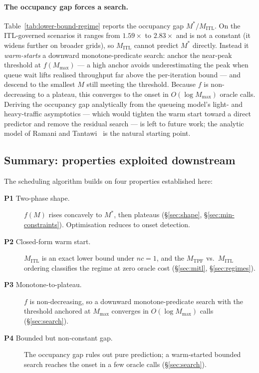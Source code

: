 \paragraph{The occupancy gap forces a search.}
Table~\ref{tab:lower-bound-regime} reports the occupancy gap $M^\ast/M_{\mathrm{ITL}}$.
On the ITL-governed scenarios it ranges from $1.59\times$ to $2.83\times$ and is not a
constant (it widens further on broader grids), so $M_{\mathrm{ITL}}$ cannot predict
$M^\ast$ directly. Instead it \emph{warm-starts} a downward monotone-predicate search:
anchor the near-peak threshold at $f(M_{\max})$ --- a high anchor avoids underestimating
the peak when queue wait lifts realised throughput far above the per-iteration bound ---
and descend to the smallest $M$ still meeting the threshold. Because $f$ is non-decreasing
to a plateau, this converges to the onset in $O(\log M_{\max})$ oracle calls. Deriving the
occupancy gap analytically from the queueing model's light- and heavy-traffic asymptotics
--- which would tighten the warm start toward a direct predictor and remove the residual
search --- is left to future work; the analytic model of Ramani and
Tantawi~\cite{ramani2026queueing} is the natural starting point.



\subsection{Summary: properties exploited downstream}
\label{sec:summary}

The scheduling algorithm builds on four properties established here:
\begin{description}
  \item[\textbf{P1} Two-phase shape.] $f(M)$ rises concavely to $M^\ast$, then plateaus
    (\S\ref{sec:shape}, \S\ref{sec:min-constraints}). Optimisation reduces to onset
    detection.
  \item[\textbf{P2} Closed-form warm start.] $M_{\mathrm{ITL}}$ is an exact lower bound
    under $nc=1$, and the $M_{\mathrm{TPF}}$ vs.\ $M_{\mathrm{ITL}}$ ordering classifies
    the regime at zero oracle cost (\S\ref{sec:mitl}, \S\ref{sec:regimes}).
  \item[\textbf{P3} Monotone-to-plateau.] $f$ is non-decreasing, so a downward
    monotone-predicate search with the threshold anchored at $M_{\max}$ converges in
    $O(\log M_{\max})$ calls (\S\ref{sec:search}).
  \item[\textbf{P4} Bounded but non-constant gap.] The occupancy gap rules out pure
    prediction; a warm-started bounded search reaches the onset in a few oracle calls
    (\S\ref{sec:search}).
\end{description}
